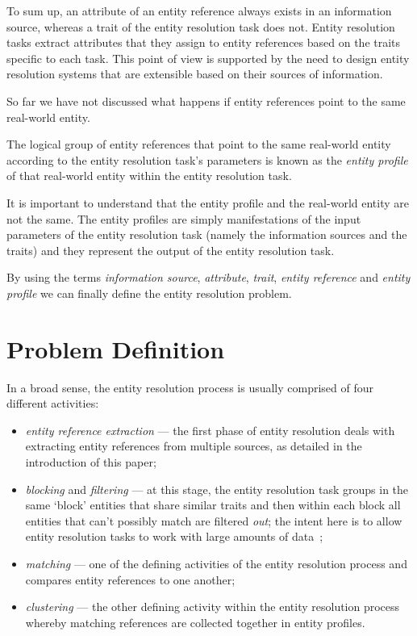 \documentclass[lettersize,journal]{IEEEtran}
\begin{document}
    To sum up, an attribute of an entity reference always exists in an
    information source, whereas a trait of the entity resolution task does not.
    Entity resolution tasks extract attributes that they assign to entity
    references based on the traits specific to each task.
    This point of view is supported by the need to design entity resolution
    systems that are extensible based on their sources of
    information\cite{fever2009,magellan2020,oyster2012}.

    So far we have not discussed what happens if entity references point to the
    same real-world entity.
    
    \begin{defn}
        The logical group of entity references that point to the same real-world
        entity according to the entity resolution task's parameters is known as
        the \textit{entity profile} of that real-world entity within the entity
        resolution task.
    \end{defn}

    It is important to understand that the entity profile and the real-world
    entity are not the same.
    The entity profiles are simply manifestations of the input parameters of the
    entity resolution task (namely the information sources and the traits) and
    they represent the output of the entity resolution task.
    
    By using the terms \textit{information source}, \textit{attribute},
    \textit{trait}, \textit{entity reference} and \textit{entity profile} we can
    finally define the entity resolution problem.

    \section{Problem Definition}\label{sec:problem}

    In a broad sense, the entity resolution process is usually comprised of four
    different activities\cite{Pap19,Tal11}:
    \begin{itemize}
        \item \textit{entity reference extraction} --- the first phase of entity
        resolution deals with extracting entity references from multiple
        sources, as detailed in the introduction of this paper;
        \item \textit{blocking} and \textit{filtering} --- at this stage, the
        entity resolution task groups in the same `block' entities that share
        similar traits and then within each block all entities that can't
        possibly match are filtered \textit{out}; the intent here is to allow
        entity resolution tasks to work with large amounts of data~\cite{Pap19};
        \item \textit{matching} --- one of the defining activities of the entity
        resolution process and compares entity references to one another;
        \item \textit{clustering} --- the other defining activity within the
        entity resolution process whereby matching references are collected
        together in entity profiles.
    \end{itemize}
\end{document}
